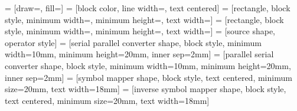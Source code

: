 %



%
%
%
   = [draw=\blockdrawcolor,
      fill=\blockfillcolor]
%
   = [block color,
      line width=\blocklinewidth,
      text centered]
%
   = [rectangle,
      block style,
      minimum width=\blockwidth,
      minimum height=\blockheight,
      text width=\blocktextwidth]
%
   = [rectangle,
      block style,
      minimum width=\filterwidth,
      minimum height=\filterheight,
      text width=\filtertextwidth]
%
   = [source shape,
      operator style]
%
   = [serial parallel converter shape,
      block style,
      minimum width=10mm,
      minimum height=20mm,
      inner sep=2mm]
%
   = [parallel serial converter shape,
      block style,
      minimum width=10mm,
      minimum height=20mm,
      inner sep=2mm]
%
   = [symbol mapper shape,
      block style,
      text centered,
      minimum size=20mm,
      text width=18mm]
%
   = [inverse symbol mapper shape,
      block style,
      text centered,
      minimum size=20mm,
      text width=18mm]


